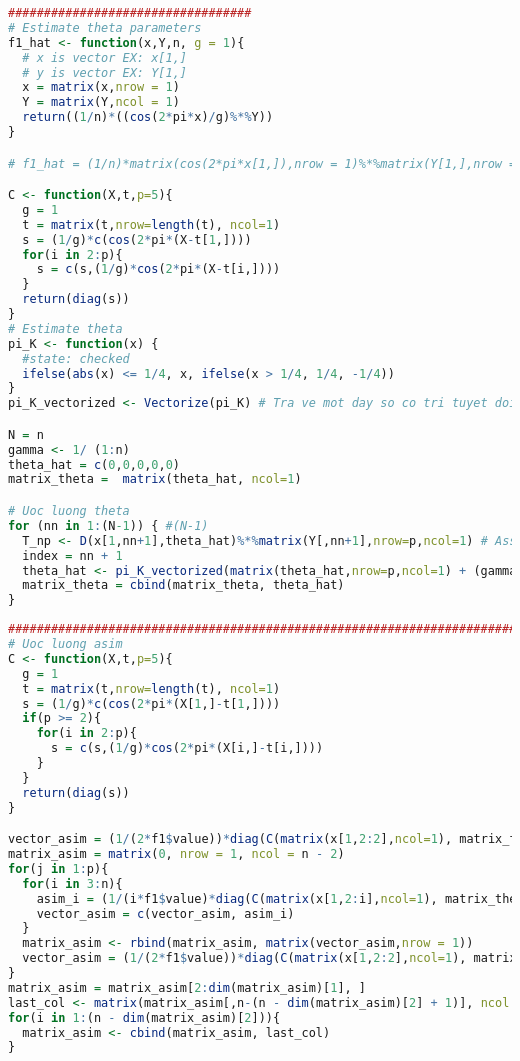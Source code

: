 \begin{lstlisting}[language=R,title = Phần 4: Ước lượng tham số chuyển]
##################################
# Estimate theta parameters
f1_hat <- function(x,Y,n, g = 1){
  # x is vector EX: x[1,]
  # y is vector EX: Y[1,]
  x = matrix(x,nrow = 1)
  Y = matrix(Y,ncol = 1)
  return((1/n)*((cos(2*pi*x)/g)%*%Y))
}

# f1_hat = (1/n)*matrix(cos(2*pi*x[1,]),nrow = 1)%*%matrix(Y[1,],nrow = length(Y[1,]))  

C <- function(X,t,p=5){
  g = 1
  t = matrix(t,nrow=length(t), ncol=1)
  s = (1/g)*c(cos(2*pi*(X-t[1,])))
  for(i in 2:p){
    s = c(s,(1/g)*cos(2*pi*(X-t[i,])))
  }
  return(diag(s))
}
# Estimate theta
pi_K <- function(x) {
  #state: checked
  ifelse(abs(x) <= 1/4, x, ifelse(x > 1/4, 1/4, -1/4))
}
pi_K_vectorized <- Vectorize(pi_K) # Tra ve mot day so co tri tuyet doi nho hon hoac bang 0.25

N = n
gamma <- 1/ (1:n)  
theta_hat = c(0,0,0,0,0)
matrix_theta =  matrix(theta_hat, ncol=1)

# Uoc luong theta
for (nn in 1:(N-1)) { #(N-1)
  T_np <- D(x[1,nn+1],theta_hat)%*%matrix(Y[,nn+1],nrow=p,ncol=1) # Assuming Y_n = 1 and g(X_n) = 1 (uniform density)
  index = nn + 1
  theta_hat <- pi_K_vectorized(matrix(theta_hat,nrow=p,ncol=1) + (gamma_j*gamma[index]) * T_np)
  matrix_theta = cbind(matrix_theta, theta_hat)
}
\end{lstlisting}
\newpage
\begin{lstlisting}[language=R, title = Phần 5: Ước lượng tham số co giãn]
###############################################################################
# Uoc luong asim
C <- function(X,t,p=5){
  g = 1
  t = matrix(t,nrow=length(t), ncol=1)
  s = (1/g)*c(cos(2*pi*(X[1,]-t[1,])))
  if(p >= 2){
    for(i in 2:p){
      s = c(s,(1/g)*cos(2*pi*(X[i,]-t[i,])))
    }  
  }
  return(diag(s))
}

vector_asim = (1/(2*f1$value))*diag(C(matrix(x[1,2:2],ncol=1), matrix_theta[1,1:(2-1)],p=2-1))%*%matrix(Y[1,2:2],ncol = 1)
matrix_asim = matrix(0, nrow = 1, ncol = n - 2)
for(j in 1:p){
  for(i in 3:n){
    asim_i = (1/(i*f1$value)*diag(C(matrix(x[1,2:i],ncol=1), matrix_theta[j,1:(i-1)],p=i-1))%*%matrix(Y[j,2:i],ncol = 1))
    vector_asim = c(vector_asim, asim_i)
  }
  matrix_asim <- rbind(matrix_asim, matrix(vector_asim,nrow = 1))
  vector_asim = (1/(2*f1$value))*diag(C(matrix(x[1,2:2],ncol=1), matrix_theta[j,1:(2-1)],p=2-1))%*%matrix(Y[j,2:2],ncol = 1)
}
matrix_asim = matrix_asim[2:dim(matrix_asim)[1], ]
last_col <- matrix(matrix_asim[,n-(n - dim(matrix_asim)[2] + 1)], ncol = 1)
for(i in 1:(n - dim(matrix_asim)[2])){
  matrix_asim <- cbind(matrix_asim, last_col)
}
\end{lstlisting}
